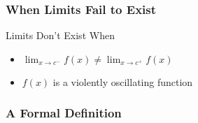 \documentclass{MathNotes}
\begin{document}
\subsubsection{When Limits Fail to Exist}
\begin{note}{Limits Don't Exist When}
    \begin{itemize}
        \item $\lim_{x\to c^-}f(x)\neq \lim_{x\to c^+}f(x)$
        \item $f(x)$ is a violently oscillating function
    \end{itemize}
\end{note}

\subsubsection{A Formal Definition}
\end{document}
